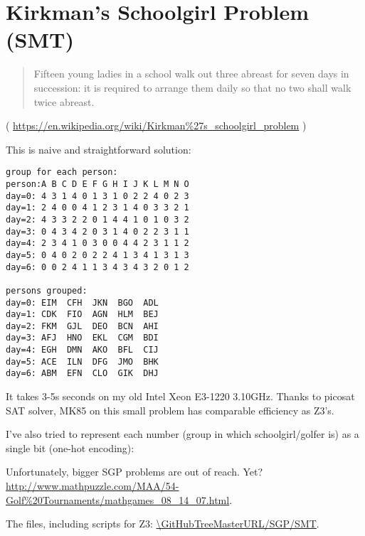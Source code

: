\section{Kirkman's Schoolgirl Problem (SMT)}

\renewcommand{\CURPATH}{SGP/SMT}

\begin{framed}
\begin{quotation}
Fifteen young ladies in a school walk out three abreast for seven days in succession: it is required to arrange them daily so that no two shall walk twice abreast.
\end{quotation}
\end{framed}

( \url{https://en.wikipedia.org/wiki/Kirkman%27s_schoolgirl_problem} )

This is naive and straightforward solution:



\begin{lstlisting}
group for each person:
person:A B C D E F G H I J K L M N O
day=0: 4 3 1 4 0 1 3 1 0 2 2 4 0 2 3
day=1: 2 4 0 0 4 1 2 3 1 4 0 3 3 2 1
day=2: 4 3 3 2 2 0 1 4 4 1 0 1 0 3 2
day=3: 0 4 3 4 2 0 3 1 4 0 2 2 3 1 1
day=4: 2 3 4 1 0 3 0 0 4 4 2 3 1 1 2
day=5: 0 4 0 2 0 2 2 4 1 3 4 1 3 1 3
day=6: 0 0 2 4 1 1 3 4 3 4 3 2 0 1 2

persons grouped:
day=0: EIM  CFH  JKN  BGO  ADL
day=1: CDK  FIO  AGN  HLM  BEJ
day=2: FKM  GJL  DEO  BCN  AHI
day=3: AFJ  HNO  EKL  CGM  BDI
day=4: EGH  DMN  AKO  BFL  CIJ
day=5: ACE  ILN  DFG  JMO  BHK
day=6: ABM  EFN  CLO  GIK  DHJ
\end{lstlisting}

It takes 3-5s seconds on my old Intel Xeon E3-1220 3.10GHz.
Thanks to picosat SAT solver, MK85 on this small problem has comparable efficiency as Z3's.

I've also tried to represent each number (group in which schoolgirl/golfer is) as a single bit (one-hot encoding):



Unfortunately, bigger \ac{SGP} problems are out of reach. Yet?
\url{http://www.mathpuzzle.com/MAA/54-Golf%20Tournaments/mathgames_08_14_07.html}.

The files, including scripts for Z3: \url{\GitHubTreeMasterURL/\CURPATH}.

